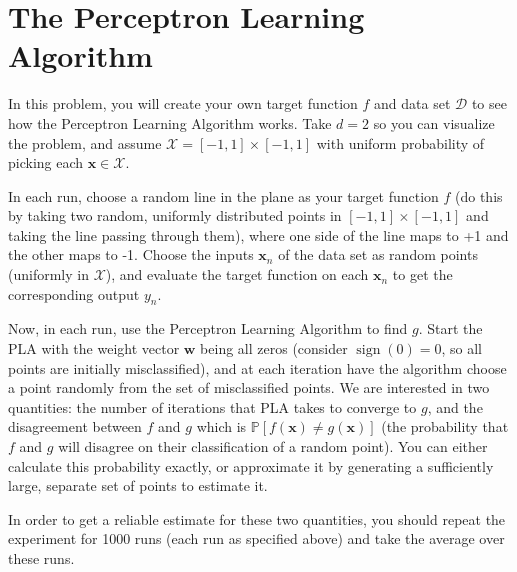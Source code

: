 \documentclass{article}
\DeclareMathOperator{\sign}{sign}
\begin{document}
\section{The Perceptron Learning Algorithm}

In this problem, you will create your own target function $f$ and data set $\mathcal{D}$ to see how the Perceptron Learning Algorithm works. Take $d = 2$ so you can visualize the problem, and assume $\mathcal{X} = [-1, 1] \times [-1, 1]$ with uniform probability of picking each $\mathbf{x} \in \mathcal{X}$.

In each run, choose a random line in the plane as your target function $f$ (do this by taking two random, uniformly distributed points in $[-1, 1] \times [-1, 1]$ and taking the line passing through them), where one side of the line maps to +1 and the other maps to -1. Choose the inputs $\mathbf{x}_n$ of the data set as random points (uniformly in $\mathcal{X}$), and evaluate the target function on each $\mathbf{x}_n$ to get the corresponding output $y_n$.

Now, in each run, use the Perceptron Learning Algorithm to find $g$. Start the PLA
with the weight vector $\mathbf{w}$ being all zeros (consider $\sign(0) = 0$, so all points are initially misclassified), and at each iteration have the algorithm choose a point randomly from the set of misclassified points. We are interested in two quantities: the number of iterations that PLA takes to converge to $g$, and the disagreement between $f$ and $g$ which is $\mathbb{P}[f(\mathbf{x}) \neq g(\mathbf{x})]$ (the probability that $f$ and $g$ will disagree on their classification of a random point). You can either calculate this probability exactly, or approximate it by generating a sufficiently large, separate set of points to estimate it.

In order to get a reliable estimate for these two quantities, you should repeat the experiment for 1000 runs (each run as specified above) and take the average over these runs.

\end{document}
